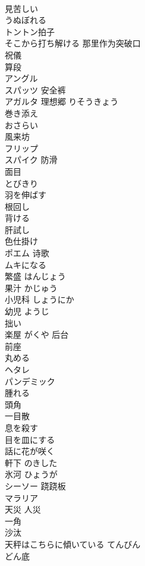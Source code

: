\documentclass[8pt]{extreport}
\begin{document}
\begin{CJK}{UTF8}{min}
\\	見苦しい	
\\	うぬぼれる	
\\	トントン拍子	
\\	そこから打ち解ける	那里作为突破口
\\	祝儀	
\\	算段	
\\	アングル	
\\	スパッツ	安全裤
\\	アガルタ	理想郷 りそうきょう
\\	巻き添え	
\\	おさらい	
\\	風来坊	
\\	フリップ	
\\	スパイク	防滑
\\	面目	
\\	とびきり	
\\	羽を伸ばす	
\\	根回し	
\\	背ける	
\\	肝試し	
\\	色仕掛け	
\\	ポエム	诗歌
\\	ムキになる	
\\	繁盛	はんじょう
\\	果汁	かじゅう
\\	小児科	しょうにか
\\	幼児	ようじ
\\	拙い	
\\	楽屋	がくや 后台
\\	前座	
\\	丸める	
\\	ヘタレ	
\\	パンデミック	
\\	腫れる	
\\	頭角	
\\	一目散	
\\	息を殺す	
\\	目を皿にする	
\\	話に花が咲く	
\\	軒下	のきした
\\	氷河	ひょうが
\\	シーソー	跷跷板
\\	マラリア	
\\	天災 人災	
\\	一角	
\\	沙汰	
\\	天秤はこちらに傾いている	てんびん
\\	どん底	

\end{CJK}
\end{document}
